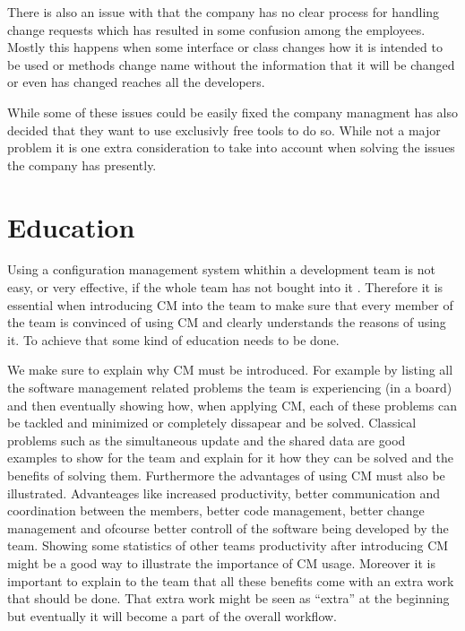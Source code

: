 \documentclass[a4paper]{article}
\begin{document}
There is also an issue with that the company has no clear process for handling change requests which has resulted in some confusion among the employees. Mostly this happens when some interface or class changes how it is intended to be used or methods change name without the information that it will be changed or even has changed reaches all the developers.

While some of these issues could be easily fixed the company managment has also decided that they want to use exclusivly free tools to do so. While not a major problem it is one extra consideration to take into account when solving the issues the company has presently.

\section{Education}
Using a configuration management system whithin a development team is not easy, or very effective, if the whole team has not bought into it \cite{mikkelsen-pherigo}. Therefore it is essential when introducing CM into the team to make sure that every member of the team is convinced of using CM and clearly understands the reasons of using it. To achieve that some kind of education needs to be done.

We make sure to explain why CM must be introduced. For example by listing all the software management related problems the team is experiencing (in a board) and then eventually showing how, when applying CM, each of these problems can be tackled and minimized or completely dissapear and be solved. Classical problems such as the simultaneous update and the shared data are good examples to show for the team and explain for it how they can be solved and the benefits of solving them. Furthermore the advantages of using CM must also be illustrated. Advanteages like increased productivity, better communication and coordination between the members, better code management, better change management and ofcourse better controll of the software being developed by the team. Showing some statistics of other teams productivity after introducing CM might be a good way to illustrate the importance of CM usage. Moreover it is important to explain to the team that all these benefits come with an extra work that should be done. That extra work might be seen as “extra” at the beginning but eventually it will become a part of the overall workflow. 
\end{document}
